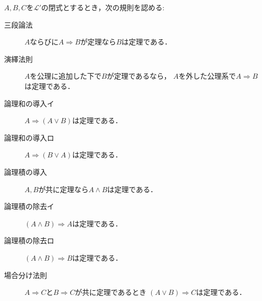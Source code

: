 	\begin{screen}
		\begin{metaaxm}[基本的な推論規則]\label{metaaxm:fundamental_rules_of_inference}
			$A,B,C$を$\mathcal{L}'$の閉式とするとき，次の規則を認める:
			\begin{description}
				\item[三段論法] $A$ならびに$A \Longrightarrow B$が定理なら$B$は定理である．
				\item[演繹法則] $A$を公理に追加した下で$B$が定理であるなら，
					$A$を外した公理系で$A \Longrightarrow B$は定理である．
				\item[論理和の導入イ] $A \Longrightarrow (A \vee B)$は定理である．
				\item[論理和の導入ロ] $A \Longrightarrow (B \vee A)$は定理である．
				\item[論理積の導入] $A,B$が共に定理なら$A \wedge B$は定理である．
				\item[論理積の除去イ] $(A \wedge B) \Longrightarrow A$は定理である．
				\item[論理積の除去ロ] $(A \wedge B) \Longrightarrow B$は定理である．
				\item[場合分け法則] $A \Longrightarrow C$と$B \Longrightarrow C$が共に定理であるとき
					$(A \vee B) \Longrightarrow C$は定理である．
			\end{description}	
		\end{metaaxm}
	\end{screen}
	
	
